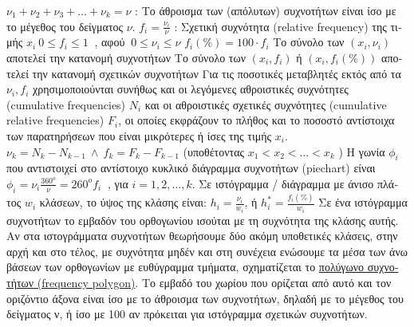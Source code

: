 \documentclass[12pt]{article}
\begin{document}
\begin{flushleft}
	\textbullet \quad $\displaystyle \nu_1 + \nu_2 + \nu_3 + \ldots + \nu_k = \nu$  :  \textgreek{Το άθροισμα των (απόλυτων) συχνοτήτων είναι ίσο με το μέγεθος του δείγματος} $\nu$. \linebreak 
	\textbullet \quad $\displaystyle f_i = \frac{\nu_i}{\nu} $  :  \textgreek{Σχετική συχνότητα} (relative frequency) \textgreek{της τιμής} $x_i \ 0\leq f_i \leq 1 \ $ , 	\textgreek{αφού} $\ 0 \leq \nu_i \leq \nu$ \linebreak 
	$\displaystyle f_i(\%) = 100\cdot f_i $ \linebreak 
	\textbullet \quad \textgreek{Το σύνολο των} $\left(x _{i}, \nu _{i} \right)$ \textgreek{αποτελεί την κατανομή συχνοτήτων} \linebreak 
	\textbullet \quad \textgreek{Το σύνολο των} $\left( x_i, f_i \right) $ \textgreek{ή} $(x_i, f_i(\%))$ \textgreek{αποτελεί την κατανομή σχετικών συχνοτήτων} \linebreak 
	\textbullet \quad \textgreek{Για τις ποσοτικές μεταβλητές εκτός από τα} $\nu_i, f_i $ \textgreek{χρησιμοποιούνται συνήθως και οι λεγόμενες αθροιστικές συχνότητες} (cumulative frequencies) $N_i$ \textgreek{και οι αθροιστικές σχετικές συχνότητες} (cumulative relative frequencies) $F_i$, \textgreek{οι οποίες εκφράζουν το πλήθος και το ποσοστό αντίστοιχα των παρατηρήσεων που είναι μικρότερες ή ίσες της τιμής} $x_i$. \linebreak 
	\textbullet \quad $\displaystyle \nu_k = N_k - N_{k-1} \ \land \ f_k = F_k - F_{k-1} $ \textgreek{(υποθέτοντας} $x_1 < x_2 < \ldots < x_k$ ) \linebreak 
	\textbullet \quad \textgreek{Η γωνία} $\phi_i$ \textgreek{που αντιστοιχεί στο αντίστοιχο κυκλικό διάγραμμα συχνοτήτων} (piechart) \textgreek{είναι} $\displaystyle \phi_i = \nu_i \frac{360^o}{\nu} = 260^o f_i \ $ , \textgreek{για} $i=1,2,\ldots , k$. \linebreak 
	\textbullet \quad \textgreek{Σε ιστόγραμμα / διάγραμμα με άνισο πλάτος} $w_i$ \textgreek{κλάσεων, το ύψος της κλάσης είναι}: $\displaystyle h_i = \frac{\nu_i}{w_i}$, \textgreek{ή} $\displaystyle h_i^* = \frac{f_i(\%)}{w_i} $ \linebreak 
	\textbullet \quad \textgreek{Σε ένα ιστόγραμμα συχνοτήτων το εμβαδόν του ορθογωνίου ισούται με τη συχνότητα της κλάσης αυτής}. \linebreak 
	\textbullet \quad \textgreek{Αν στα ιστογράμματα συχνοτήτων θεωρήσουμε δύο ακόμη υποθετικές κλάσεις, στην αρχή και στο τέλος, με συχνότητα μηδέν και στη συνέχεια ενώσουμε τα μέσα των άνω βάσεων των ορθογωνίων με ευθύγραμμα τμήματα, σχηματίζεται το} \uline{\textgreek{πολύγωνο συχνοτήτων} (frequency polygon)}. \textgreek{Το εμβαδό του χωρίου που ορίζεται από αυτό και τον οριζόντιο άξονα είναι ίσο με το άθροισμα των συχνοτήτων, δηλαδή με το μέγεθος του δείγματος ν, ή ίσο με 100 αν πρόκειται για ιστόγραμμα σχετικών συχνοτήτων}. \linebreak 
	

\end{flushleft}
\end{document}
